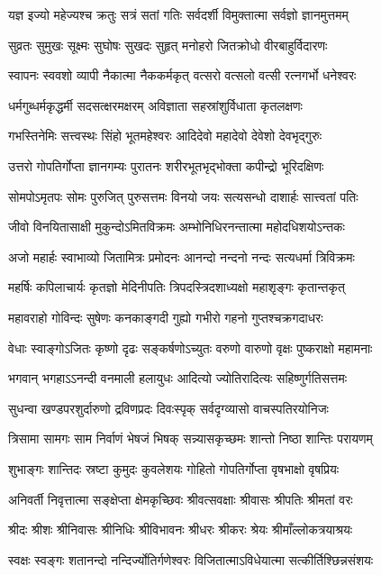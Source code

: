 \twolineshloka
{यज्ञ इज्यो महेज्यश्च क्रतुः सत्रं सतां गतिः}
{सर्वदर्शी विमुक्तात्मा सर्वज्ञो ज्ञानमुत्तमम्}

\twolineshloka
{सुव्रतः सुमुखः सूक्ष्मः सुघोषः सुखदः सुहृत्}
{मनोहरो जितक्रोधो वीरबाहुर्विदारणः}

\twolineshloka
{स्वापनः स्ववशो व्यापी नैकात्मा नैककर्मकृत्}
{वत्सरो वत्सलो वत्सी रत्नगर्भो धनेश्वरः}

\twolineshloka
{धर्मगुब्धर्मकृद्धर्मी सदसत्क्षरमक्षरम्}
{अविज्ञाता सहस्रांशुर्विधाता कृतलक्षणः}

\twolineshloka
{गभस्तिनेमिः सत्त्वस्थः सिंहो भूतमहेश्वरः}
{आदिदेवो महादेवो देवेशो देवभृद्गुरुः}

\twolineshloka
{उत्तरो गोपतिर्गोप्ता ज्ञानगम्यः पुरातनः}
{शरीरभूतभृद्भोक्ता कपीन्द्रो भूरिदक्षिणः}

\twolineshloka
{सोमपोऽमृतपः सोमः पुरुजित् पुरुसत्तमः}
{विनयो जयः सत्यसन्धो दाशार्हः सात्त्वतां पतिः}

\twolineshloka
{जीवो विनयितासाक्षी मुकुन्दोऽमितविक्रमः}
{अम्भोनिधिरनन्तात्मा महोदधिशयोऽन्तकः}

\twolineshloka
{अजो महार्हः स्वाभाव्यो जितामित्रः प्रमोदनः}
{आनन्दो नन्दनो नन्दः सत्यधर्मा त्रिविक्रमः}

\twolineshloka
{महर्षिः कपिलाचार्यः कृतज्ञो मेदिनीपतिः}
{त्रिपदस्त्रिदशाध्यक्षो महाशृङ्गः कृतान्तकृत्}

\twolineshloka
{महावराहो गोविन्दः सुषेणः कनकाङ्गदी}
{गुह्यो गभीरो गहनो गुप्तश्चक्रगदाधरः}

\twolineshloka
{वेधाः स्वाङ्गोऽजितः कृष्णो दृढः सङ्कर्षणोऽच्युतः}
{वरुणो वारुणो वृक्षः पुष्कराक्षो महामनाः}

\twolineshloka
{भगवान् भगहाऽऽनन्दी वनमाली हलायुधः}
{आदित्यो ज्योतिरादित्यः सहिष्णुर्गतिसत्तमः}

\twolineshloka
{सुधन्वा खण्डपरशुर्दारुणो द्रविणप्रदः}
{दिवःस्पृक् सर्वदृग्व्यासो वाचस्पतिरयोनिजः}

\twolineshloka
{त्रिसामा सामगः साम निर्वाणं भेषजं भिषक्}
{सन्न्यासकृच्छमः शान्तो निष्ठा शान्तिः परायणम्}

\twolineshloka
{शुभाङ्गः शान्तिदः स्रष्टा कुमुदः कुवलेशयः}
{गोहितो गोपतिर्गोप्ता वृषभाक्षो वृषप्रियः}

\twolineshloka
{अनिवर्ती निवृत्तात्मा सङ्क्षेप्ता क्षेमकृच्छिवः}
{श्रीवत्सवक्षाः श्रीवासः श्रीपतिः श्रीमतां वरः}

\twolineshloka
{श्रीदः श्रीशः श्रीनिवासः श्रीनिधिः श्रीविभावनः}
{श्रीधरः श्रीकरः श्रेयः श्रीमाँल्लोकत्रयाश्रयः}

\twolineshloka
{स्वक्षः स्वङ्गः शतानन्दो नन्दिर्ज्योतिर्गणेश्वरः}
{विजितात्माऽविधेयात्मा सत्कीर्तिश्छिन्नसंशयः}

